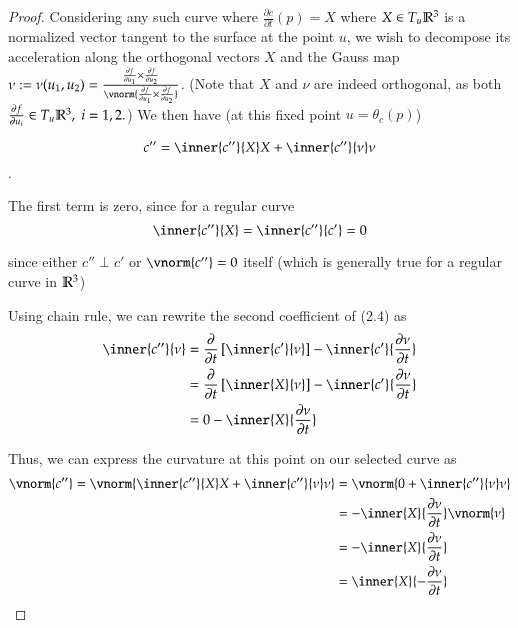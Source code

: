 		\begin{proof}
		Considering any such curve where $\frac{\partial c}{\partial t}(p) = X$ where $X \in T_u \mathbb{R}^3$ is a normalized vector tangent to the surface at the point $u$,
		we wish to decompose its acceleration along the  orthogonal vectors $X$ and
		the Gauss map $\nu := \nu(u_1, u_2) =
			\frac{\frac{\partial f}{\partial u_1} \times \frac{\partial f}{\partial u_2}}
			{\vnorm{\frac{\partial f}{\partial u_1} \times \frac{\partial f}{\partial u_2}}}$. (Note that $X$ and $\nu$ are indeed orthogonal,
			as both $\frac{\partial f}{\partial u_i} \in T_u \mathbb{R}^3, \; i=1,2.$) We then have
			(at this fixed point $u=\theta_c(p)$)
			
			\begin{equation}
				c'' = \inner{c''}{X} X + \inner{c''}{\nu}\nu
				\end{equation}. 
		
		The first term is zero, since for a regular curve
		\[ \inner{c''}{X} = \inner{c''}{c'} = 0 \]
		
		since either $c'' \perp c'$ or $\vnorm{c''} = 0$ itself (which is generally true for a regular curve in $\mathbb{R}^3$) %
		
		Using chain rule, we can rewrite the second coefficient of (2.4) as %
		\begin{align}
			\inner{c''}{\nu} &=
			\frac{\partial}{\partial t}\left[ \inner{c'}{\nu} \right]
				- \inner{c'}{\frac{\partial \nu}{\partial t}} \\
				&= \frac{\partial}{\partial t}\left[ \inner{X}{\nu} \right]
				- \inner{c'}{\frac{\partial \nu}{\partial t}} \\
				&= 0 - \inner{X}{\frac{\partial \nu}{\partial t}}
				\end{align}
		
		Thus, we can express the curvature at this point on our selected curve as
		\begin{align}
		\vnorm{c''} = \vnorm{\inner{c''}{X} X + \inner{c''}{\nu}\nu}
		&= \vnorm{0 + \inner{c''}{\nu}\nu} \\
		&= - \inner{X}{\frac{\partial \nu}{\partial t}}\vnorm{\nu} \\
		&= - \inner{X}{\frac{\partial \nu}{\partial t}} \\
		&=  \inner{X}{-\frac{\partial \nu}{\partial t}}
		\end{align}
		

\end{proof}

